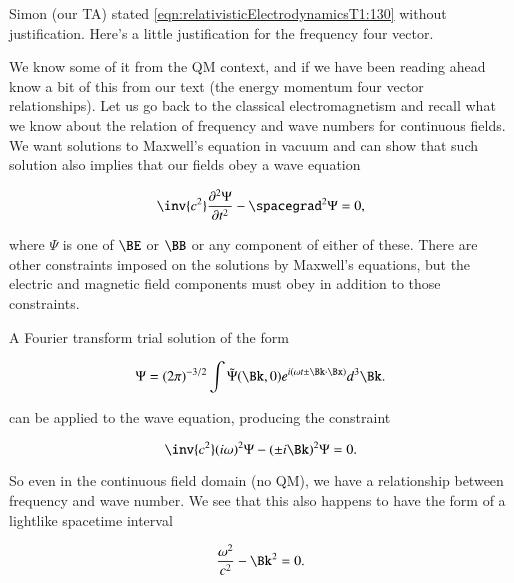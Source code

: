 %
%

Simon (our TA) stated \cref{eqn:relativisticElectrodynamicsT1:130} without justification.  Here's a little justification for the frequency four vector.

We know some of it from the QM context, and if we have been reading ahead know a bit of this from our text \citep{landau1980classical} (the energy momentum four vector relationships).  Let us go back to the classical electromagnetism and recall what we know about the relation of frequency and wave numbers for continuous fields.  We want solutions to Maxwell's equation in vacuum and can show that such solution also implies that our fields obey a wave equation

\begin{equation}\label{eqn:relativisticElectrodynamicsT1:131}
\inv{c^2} \frac{\partial^2 \Psi}{\partial t^2} - \spacegrad^2 \Psi = 0,
\end{equation}

where \(\Psi\) is one of \(\BE\) or \(\BB\) or any component of either of these.  There are other constraints imposed on the solutions by Maxwell's equations, but the electric and magnetic field components must obey  in addition to those constraints.

A Fourier transform trial solution of the form

\begin{equation}\label{eqn:relativisticElectrodynamicsT1:132}
\Psi = (2 \pi)^{-3/2} \int \tilde{\Psi}(\Bk, 0) e^{i (\omega t \pm \Bk \cdot \Bx) } d^3 \Bk.
\end{equation}

can be applied to the wave equation, producing the constraint

\begin{equation}\label{eqn:relativisticElectrodynamicsT1:133}
\inv{c^2} (i \omega)^2 \Psi - (\pm i \Bk)^2 \Psi = 0.
\end{equation}

So even in the continuous field domain (no QM), we have a relationship between frequency and wave number.  We see that this also happens to have the form of a lightlike spacetime interval

\begin{equation}\label{eqn:relativisticElectrodynamicsT1:134}
\frac{\omega^2}{c^2} - \Bk^2 = 0.
\end{equation}

